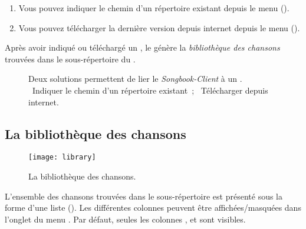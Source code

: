 \begin{enumerate}
\item Vous pouvez indiquer le chemin d'un répertoire
   existant depuis le menu
   ().
\item Vous pouvez télécharger la dernière version depuis internet
  depuis le menu 
  ().
\end{enumerate}

Après avoir indiqué ou téléchargé un \recueil, le \client génère la
\emph{bibliothèque des chansons} trouvées dans le sous-répertoire
 du \recueil.


\begin{figure}
  \centering
  \hspace{0.1cm}%
  \caption{%
    Deux solutions permettent de lier le \emph{Songbook-Client} à un \recueil.
    ~Indiquer le chemin d'un répertoire existant~;%
    ~Télécharger depuis internet.%
  }%
  \label{fig:solutions}
\end{figure}


\subsection{La bibliothèque des chansons}

\begin{figure}
  \centering
  \texttt{[image: library]}
  \caption{La bibliothèque des chansons.}
  \label{fig:library}
\end{figure}

L'ensemble des chansons  trouvées dans le sous-répertoire
 est présenté sous la forme d'une liste
(). Les différentes colonnes peuvent être
affichées/masquées dans l'onglet  du menu
. Par défaut, seules les colonnes
,  et  sont visibles.

